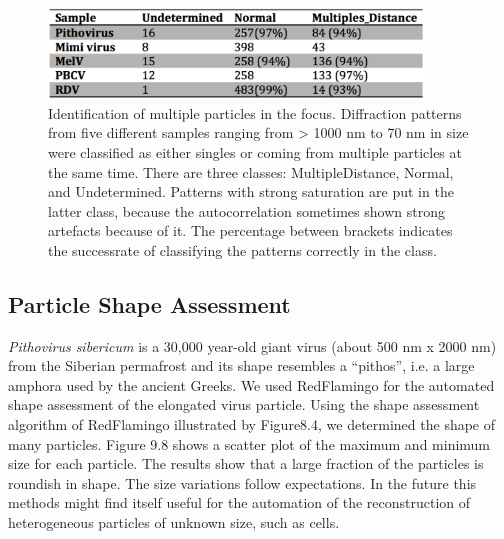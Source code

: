 \begin{figure}[!ht]
\centering
\includegraphics[width=100mm]{Chapter_09_Results_successrate.png}
\caption{Identification of multiple particles in the focus. Diffraction patterns from five different samples ranging from > 1000 nm to 70 nm in size were classified as either singles or coming from multiple particles at the same time. There are three classes: MultipleDistance, Normal, and Undetermined. Patterns with strong saturation are put in the latter class, because the autocorrelation sometimes shown strong artefacts because of it. The percentage between brackets indicates the successrate of classifying the patterns correctly in the class.}\label{fig:multiple_find}

\end{figure}

\subsection{Particle Shape Assessment}

\textit{Pithovirus sibericum} is a 30,000 year-old giant virus (about 500 nm x 2000 nm) from the Siberian permafrost and its shape resembles a “pithos”, i.e. a large amphora used by the ancient Greeks. We used RedFlamingo for the automated shape assessment of the elongated virus particle. Using the shape assessment algorithm of RedFlamingo illustrated by Figure8.4, we determined the shape of many particles. Figure 9.8 shows a scatter plot of the maximum and minimum size for each particle. The results show that a large fraction of the particles is roundish in shape. The size variations follow expectations. In the future this methods might find itself useful for the automation of the reconstruction of heterogeneous particles of unknown size, such as cells.

